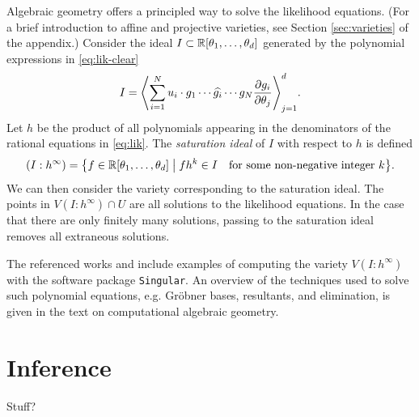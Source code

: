 \documentclass[cclicense]{hmcthesis}
\numberwithin{equation}{chapter}
\numberwithin{thmcounter}{chapter}
\begin{document}
    Algebraic geometry offers a principled way to solve the likelihood
    equations.  (For a brief introduction to affine and projective varieties, see
    Section \ref{sec:varieties} of the appendix.)  Consider the ideal $I \subset \R[\theta_1,
    \ldots, \theta_d]$ generated by the polynomial expressions in \eqref{eq:lik-clear}
    \[
        I = \adel[\Bigg]{
            \sum_{i=1}^N u_i \cdot g_1 \cdots \widehat{g_i} \cdots g_N
            \frac{\partial g_i}{\partial \theta_j}
        }_{j=1}^d
        .
    \]
    Let $h$ be the product of all polynomials appearing in the denominators of
    the rational equations in \eqref{eq:lik}.  The \emph{saturation ideal} of
    $I$ with respect to $h$ is defined
    \[
        (I : h^\infty) = \cdel[\big]{
            f \in \R[\theta_1, \ldots, \theta_d]
            \;\big\vert\;
            fh^k \in I
            \quad
            \text{for some non-negative integer $k$}
        }.
    \]
    We can then consider the variety corresponding to the saturation ideal.  The
    points in $V(I : h^\infty) \cap U$ are all solutions to the likelihood
    equations.  In the case that there are only finitely many solutions, passing
    to the saturation ideal removes all extraneous solutions.

    The referenced works \citep{ASCB} and \citep{DSS08} include examples of
    computing the variety $V(I : h^\infty)$ with the software package
    \texttt{Singular}.  An overview of the techniques used to solve such
    polynomial equations, e.g. Gröbner bases, resultants, and elimination, is
    given in the text \citep{CLO05} on computational algebraic geometry.

\section{Inference}
    
    Stuff?
% 



\end{document}

